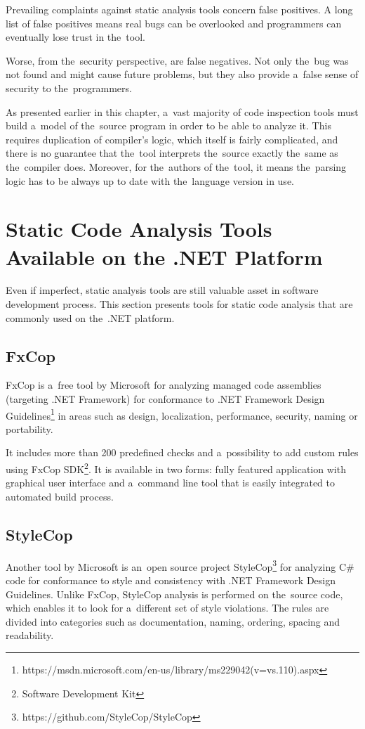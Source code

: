 \documentclass[
  digital, %
  table,   %
  lof,     %
  lot,     %
  oneside,
]{fithesis3}
\begin{document}
Prevailing complaints against static analysis tools concern false positives. A long list of false positives means real bugs can be overlooked and programmers can eventually lose trust in the~tool.

Worse, from the~security perspective, are false negatives. Not only the~bug was not found and might cause future problems, but they also provide a~false sense of security to the~programmers. 

As presented earlier in this chapter, a~vast majority of code inspection tools must build a~model of the~source program in order to be able to analyze it. This requires duplication of compiler's logic, which itself is fairly complicated, and there is no guarantee that the~tool interprets the~source exactly the~same as the~compiler does. Moreover, for the~authors of the~tool, it means the~parsing logic has to be always up to date with the~language version in use. 

\section{Static Code Analysis Tools Available on the .NET Platform}
Even if imperfect, static analysis tools are still valuable asset in software development process. This section presents tools for static code analysis that are commonly used on the~.NET platform.

\subsection{FxCop}
FxCop is a~free tool by Microsoft for analyzing managed code assemblies (targeting .NET Framework) for conformance to .NET Framework Design Guidelines\footnote{https://msdn.microsoft.com/en-us/library/ms229042(v=vs.110).aspx} in areas such as design, localization, performance, security, naming or portability. 

It includes more than 200 predefined checks and a~possibility to add custom rules using FxCop SDK\footnote{Software Development Kit}. It is available in two forms: fully featured application with graphical user interface and a~command line tool that is easily integrated to automated build process. 

\subsection{StyleCop}
Another tool by Microsoft is an~open source project StyleCop\footnote{https://github.com/StyleCop/StyleCop} for analyzing C\# code for conformance to style and consistency with .NET Framework Design Guidelines. Unlike FxCop, StyleCop analysis is performed on the~source code, which enables it to look for a~different set of style violations. The rules are divided into categories such as documentation, naming, ordering, spacing and readability. 
\end{document}

